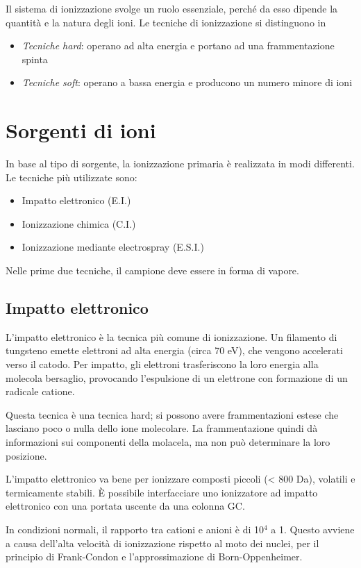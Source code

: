 Il sistema di ionizzazione svolge un ruolo essenziale, perché da esso dipende la quantità e la natura degli ioni.
Le tecniche di ionizzazione si distinguono in
\begin{itemize}
\item \textit{Tecniche hard}: operano ad alta energia e portano ad una frammentazione spinta
\item \textit{Tecniche soft}: operano a bassa energia e producono un numero minore di ioni
\end{itemize}

\section{Sorgenti di ioni}
In base al tipo di sorgente, la ionizzazione primaria è realizzata in modi differenti.
Le tecniche più utilizzate sono:
\begin{itemize}
\item Impatto elettronico (E.I.)
\item Ionizzazione chimica (C.I.)
\item Ionizzazione mediante electrospray (E.S.I.)
\end{itemize}

Nelle prime due tecniche, il campione deve essere in forma di vapore.

\subsection{Impatto elettronico}
L'impatto elettronico è la tecnica più comune di ionizzazione.
Un filamento di tungsteno emette elettroni ad alta energia (circa 70 eV), che vengono accelerati verso il catodo.
Per impatto, gli elettroni trasferiscono la loro energia alla molecola bersaglio, provocando l'espulsione di un elettrone con formazione di un radicale catione.


Questa tecnica è una tecnica hard; si possono avere frammentazioni estese che lasciano poco o nulla dello ione molecolare.
La frammentazione quindi dà informazioni sui componenti della molacela, ma non può determinare la loro posizione.

L'impatto elettronico va bene per ionizzare composti piccoli (< 800 Da), volatili e termicamente stabili.
È possibile interfacciare uno ionizzatore ad impatto elettronico con una portata uscente da una colonna GC.

In condizioni normali, il rapporto tra cationi e anioni è di 10$^4$ a 1.
Questo avviene a causa dell'alta velocità di ionizzazione rispetto al moto dei nuclei, per il principio di Frank-Condon e l'approssimazione di Born-Oppenheimer.


